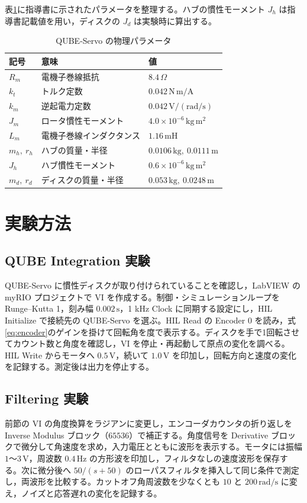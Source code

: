 \documentclass[dvipdfmx,a4paper,11pt]{jsarticle}
\begin{document}
表\ref{tab:params}に指導書に示されたパラメータを整理する。ハブの慣性モーメント $J_h$ は指導書記載値を用い，ディスクの $J_d$ は実験時に算出する。
\begin{table}[htbp]\centering\small
\caption{QUBE-Servo の物理パラメータ\cite{manual}}\label{tab:params}
\begin{tabular}{lll}\toprule
記号&意味&値\\\midrule
$R_m$&電機子巻線抵抗&$8.4\,\Omega$\\
$k_t$&トルク定数&$0.042\,\mathrm{N\,m/A}$\\
$k_m$&逆起電力定数&$0.042\,\mathrm{V/(rad/s)}$\\
$J_m$&ロータ慣性モーメント&$4.0\times10^{-6}\,\mathrm{kg\,m^2}$\\
$L_m$&電機子巻線インダクタンス&$1.16\,\mathrm{mH}$\\
$m_h,\ r_h$&ハブの質量・半径&$0.0106\,\mathrm{kg},\ 0.0111\,\mathrm{m}$\\
$J_h$&ハブ慣性モーメント&$0.6\times10^{-6}\,\mathrm{kg\,m^2}$\\
$m_d,\ r_d$&ディスクの質量・半径&$0.053\,\mathrm{kg},\ 0.0248\,\mathrm{m}$\\\bottomrule
\end{tabular}
\end{table}

\section{実験方法}
\subsection{QUBE Integration 実験}
QUBE-Servo に慣性ディスクが取り付けられていることを確認し，LabVIEW の myRIO プロジェクトで VI を作成する。制御・シミュレーションループを Runge--Kutta 1，刻み幅 $0.002\,\mathrm{s}$，1 kHz Clock に同期する設定にし，HIL Initialize で接続先の QUBE-Servo を選ぶ。HIL Read の Encoder 0 を読み，式\eqref{eq:encoder}のゲインを掛けて回転角を度で表示する。ディスクを手で1回転させてカウント数と角度を確認し，VI を停止・再起動して原点の変化を調べる。HIL Write からモータへ $0.5\,\mathrm{V}$，続いて $1.0\,\mathrm{V}$ を印加し，回転方向と速度の変化を記録する。測定後は出力を停止する。

\subsection{Filtering 実験}
前節の VI の角度換算をラジアンに変更し，エンコーダカウンタの折り返しを Inverse Modulus ブロック（$65536$）で補正する。角度信号を Derivative ブロックで微分して角速度を求め，入力電圧とともに波形を表示する。モータには振幅 $1$～$3\,\mathrm{V}$，周波数 $0.4\,\mathrm{Hz}$ の方形波を印加し，フィルタなしの速度波形を保存する。次に微分後へ $50/(s+50)$ のローパスフィルタを挿入して同じ条件で測定し，両波形を比較する。カットオフ角周波数を少なくとも $10$ と $200\,\mathrm{rad/s}$ に変え，ノイズと応答遅れの変化を記録する。
\end{document}
